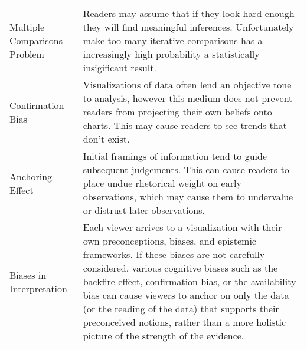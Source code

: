 \begin{table*}[h!]
\begin{tabular}{p{5cm}p{12cm}}
   \rowcolor{colord}\multirow{4}{0em}{\hspace{-0.6cm}\rotatebox{90}{\normalsize{Reading}}}Multiple Comparisons Problem  & Readers may assume that if they look hard enough they will find meaningful inferences. Unfortunately make too many iterative comparisons has a increasingly high probability a statistically insigificant result. \cite{pu2018garden, zgraggen2018investigating}\\
 \rowcolor{colord-opaque}Confirmation Bias & Visualizations of data often lend an objective tone to analysis, however this medium does not prevent readers from projecting their own beliefs onto charts. This may cause readers to see trends that don't exist. \cite{valdez2017framework, few2019loom}\\
 \rowcolor{colord}Anchoring Effect  & Initial framings of information tend to guide subsequent judgements. This can cause readers to place undue rhetorical weight on early observations, which may cause them to undervalue or distrust later observations.  \cite{ritchie2019lie, hullman2011visualization}\\
 \rowcolor{colord-opaque}Biases in Interpretation & Each viewer arrives to a visualization with their own preconceptions, biases, and epistemic frameworks. If these biases are not carefully considered, various cognitive biases such as the backfire effect, confirmation bias, or the availability bias can cause viewers to anchor on only the data (or the reading of the data) that supports their preconceived notions, rather than a more holistic picture of the strength of the evidence. \cite{dignazio2019draft, d2016feminist,valdez2017framework, few2019loom,wall2017warning}\\
\end{tabular}
\label{table:mirage-table}
\end{table*}
